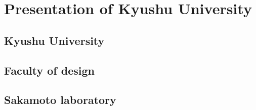 \chapter{Presentation of Kyushu University}
\section{Kyushu University}
\section{Faculty of design}
\section{Sakamoto laboratory}
